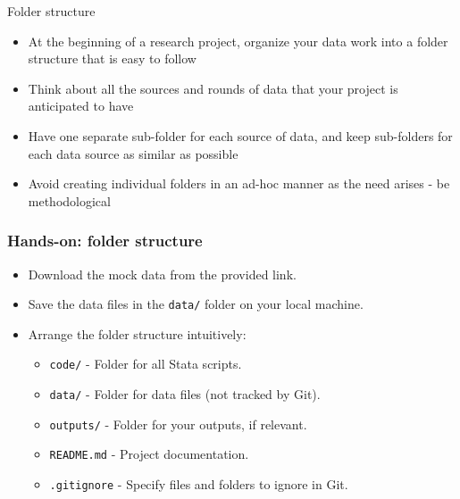 \documentclass[aspectratio=169]{beamer}
\begin{document}
\begin{frame}{Folder structure}

	\begin{itemize}
	    \item At the beginning of a research project, organize your data work into a folder structure that is easy to follow
    	\item Think about all the sources and rounds of data that your project is anticipated to have
    	\item Have one separate sub-folder for each source of data, and keep sub-folders for each data source as similar as possible
    	\item Avoid creating individual folders in an ad-hoc manner as the need arises - be methodological
    	
	\end{itemize}

\end{frame}

\begin{frame}
\frametitle{Hands-on: folder structure}
\begin{itemize}
    \item Download the mock data from the provided link.
    \item Save the data files in the \texttt{data/} folder on your local machine.
    \item Arrange the folder structure intuitively:
    \begin{itemize}
        \item \texttt{code/} - Folder for all Stata scripts.
        \item \texttt{data/} - Folder for data files (not tracked by Git).
        \item \texttt{outputs/} - Folder for your outputs, if relevant.
        \item \texttt{README.md} - Project documentation.
        \item \texttt{.gitignore} - Specify files and folders to ignore in Git.
    \end{itemize}
\end{itemize}
\end{frame}
\end{document}
